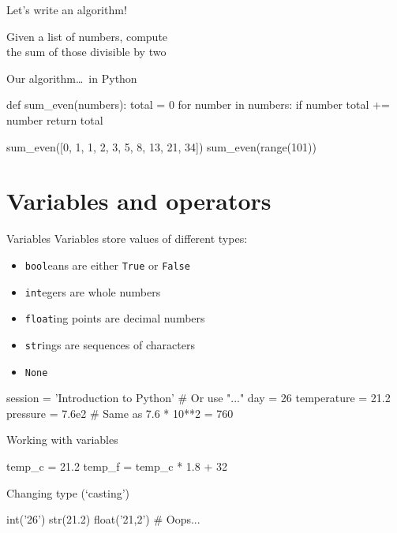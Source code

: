 \begin{frame}{Let's write an algorithm!}
    \begin{center}
        \Large%
        Given a list of numbers, compute \\
        the sum of those divisible by two
    \end{center}
\end{frame}

\begin{frame}[fragile]{Our algorithm\ldots~in Python}
    \begin{py3}
        def sum_even(numbers):
            total = 0
            for number in numbers:
                if number %
                    total += number
            return total
    \end{py3}
    \vfill
    \begin{py3}
        sum_even([0, 1, 1, 2, 3, 5, 8, 13, 21, 34])
        sum_even(range(101))
    \end{py3}
\end{frame}

\section{Variables and operators}

\begin{frame}[fragile]{Variables}
    Variables store values of different \alert{types}:
    \begin{itemize}
        \item \texttt{bool}eans are either \texttt{True}
              or \texttt{False}
        \item \texttt{int}egers are whole numbers
        \item \texttt{float}ing points are decimal numbers
        \item \texttt{str}ings are sequences of characters
        \item \texttt{None}
    \end{itemize}
    \vfill
    \begin{py3}
        session = 'Introduction to Python'  # Or use "..."
        day = 26
        temperature = 21.2
        pressure = 7.6e2  # Same as 7.6 * 10**2 = 760
    \end{py3}
\end{frame}

\begin{frame}[fragile]{Working with variables}
    \begin{py3}
        temp_c = 21.2
        temp_f = temp_c * 1.8 + 32
    \end{py3}
    \vfill\pause
    \begin{block}{Changing type (`casting')}
        \begin{py3}
            int('26')
            str(21.2)
            float('21,2')  # Oops...
        \end{py3}
    \end{block}
\end{frame}

